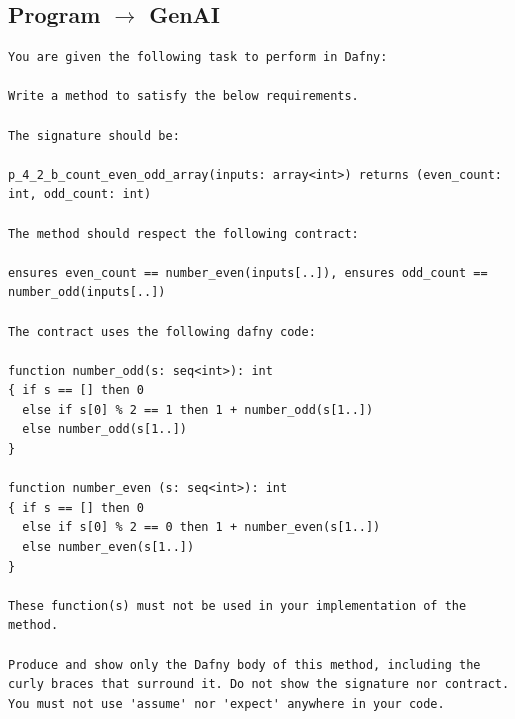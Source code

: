 \documentclass{article}
\begin{document}
\subsection*{Program $\rightarrow$ GenAI}
\begin{lstlisting}
You are given the following task to perform in Dafny:

Write a method to satisfy the below requirements.

The signature should be:

p_4_2_b_count_even_odd_array(inputs: array<int>) returns (even_count: int, odd_count: int)

The method should respect the following contract:

ensures even_count == number_even(inputs[..]), ensures odd_count == number_odd(inputs[..])

The contract uses the following dafny code:

function number_odd(s: seq<int>): int
{ if s == [] then 0
  else if s[0] % 2 == 1 then 1 + number_odd(s[1..])
  else number_odd(s[1..])
}

function number_even (s: seq<int>): int
{ if s == [] then 0
  else if s[0] % 2 == 0 then 1 + number_even(s[1..])
  else number_even(s[1..])
}

These function(s) must not be used in your implementation of the method.

Produce and show only the Dafny body of this method, including the curly braces that surround it. Do not show the signature nor contract. You must not use 'assume' nor 'expect' anywhere in your code.
\end{lstlisting}
\end{document}
